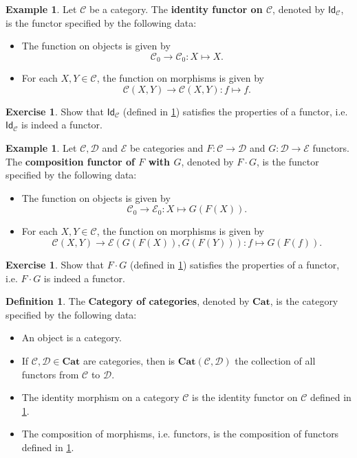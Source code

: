 \documentclass[a4paper,10pt]{scrartcl}
\theoremstyle{plain}
\theoremstyle{definition}
\newtheorem{dfn}[thm]{Definition}
\newtheorem{exa}[thm]{Example}
\newtheorem{exer}[thm]{Exercise}
\newcommand{\cfont}[1]{\ensuremath{\mathsf{#1}}}
\newcommand{\Cat}[1]{\mathcal{#1}}
\newcommand{\CC}{\Cat{C}}
\newcommand{\DD}{\Cat{D}}
\newcommand{\EE}{\Cat{E}}
\newcommand{\Catb}[1]{\mathbf{#1}}
\newcommand{\CAT}{\Catb{Cat}}
\newcommand{\Ob}[1]{{#1}_0}
\newcommand{\CHom}[3]{{#1}(#2,#3)}
\newcommand{\Id}[1][]{\cfont{Id}_{#1}}
\newcommand{\Comp}{\cdot}
\begin{document}
\begin{exa}\label{example:functor_id} Let $\CC$ be a category. The \textbf{identity functor on $\CC$}, denoted by $\Id[\CC]$, is the functor specified by the following data:
\begin{itemize}
\item The function on objects is given by
\[
\Ob{\CC}\to \Ob{\CC}: X\mapsto X.
\]
\item For each $X,Y\in\CC$, the function on morphisms is given by
\[
\CHom \CC X Y\to \CHom \CC X Y: f\mapsto f.
\]
\end{itemize}
\end{exa}

\begin{exer} Show that $\Id[\CC]$ (defined in \cref{example:functor_id}) satisfies the properties of a functor, i.e. $\Id[\CC]$ is indeed a functor.
\end{exer}

\begin{exa}\label{example:functor_comp} Let $\CC,\DD$ and $\EE$ be  categories and $F:\CC\to\DD$ and $G:\DD\to\EE$ functors. The \textbf{composition functor of $F$ with $G$}, denoted by $F\Comp G$, is the functor specified by the following data:
\begin{itemize}
\item The function on objects is given by
\[
\Ob{\CC}\to \Ob{\EE}: X\mapsto G(F(X)).
\]
\item For each $X,Y\in\CC$, the function on morphisms is given by
\[
\CHom \CC X Y\to \CHom{\EE}{G(F(X))}{G(F(Y))}: f\mapsto G(F(f)).
\]
\end{itemize}
\end{exa}

\begin{exer} Show that $F\Comp G$ (defined in \cref{example:functor_comp}) satisfies the properties of a functor, i.e. $F\Comp G$ is indeed a functor.
\end{exer}

\begin{dfn} The \textbf{Category of categories}, denoted by $\CAT$, is the category specified by the following data:
\begin{itemize}
\item An object is a category.
\item If $\CC, \DD\in\CAT$ are categories, then is $\CHom \CAT \CC \DD$ the collection of all functors from $\CC$ to $\DD$.
\item The identity morphism on a category $\CC$ is the identity functor on $\CC$ defined in \cref{example:functor_id}.
\item The composition of morphisms, i.e. functors, is the composition of functors defined in \cref{example:functor_comp}.
\end{itemize} 
\end{dfn}
\end{document}
